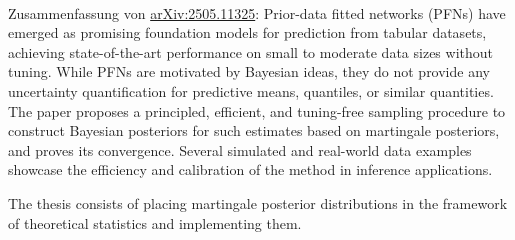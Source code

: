 \documentclass[10pt, a4paper, backaddress = off, refline = narrow, enlargefirstpage]{scrlttr2}
\begin{document}

\begin{letter}{}

\opening{~}

\vspace{-.5cm}

\sloppy
Zusammenfassung von
\href{https://arxiv.org/abs/2505.11325}{arXiv:2505.11325}: Prior-data
fitted networks (PFNs) have emerged as promising foundation models for
prediction from tabular datasets, achieving state-of-the-art
performance on small to moderate data sizes without tuning. While PFNs
are motivated by Bayesian ideas, they do not provide any uncertainty
quantification for predictive means, quantiles, or similar quantities.
The paper proposes a principled, efficient, and tuning-free sampling
procedure to construct Bayesian posteriors for such estimates based on
martingale posteriors, and proves its convergence. Several simulated
and real-world data examples showcase the efficiency and calibration
of the method in inference applications.

The thesis consists of placing martingale posterior distributions in
the framework of theoretical statistics and implementing them.

\end{letter}
\end{document}
